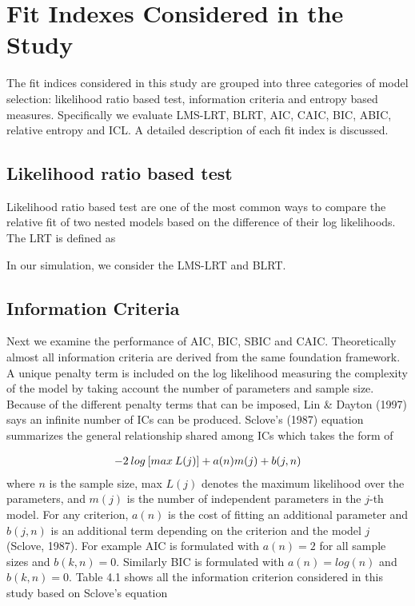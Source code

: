 

\section{Fit Indexes Considered in the Study}
The fit indices considered in this study are grouped into three categories of model selection: likelihood ratio based test, information criteria and entropy based measures. Specifically we evaluate LMS-LRT, BLRT, AIC, CAIC, BIC, ABIC, relative entropy and ICL. A detailed description of each fit index is discussed. 

\subsection{Likelihood ratio based test}
Likelihood ratio based test are one of the most common ways to compare the relative fit of two nested models based on the difference of their log likelihoods. The LRT is defined as 







In our simulation, we consider the LMS-LRT and BLRT. 





\subsection{Information Criteria}
\hspace{1em} Next we examine the performance of AIC, BIC, SBIC and CAIC. Theoretically almost all information criteria are derived from the same foundation framework. A unique penalty term is included on the log likelihood measuring the complexity of the model by taking account the number of parameters and sample size. Because of the different penalty terms that can be imposed, Lin & Dayton (1997) says an infinite number of ICs can be produced. Sclove's (1987) equation summarizes the general relationship shared among ICs which takes the form of 

\begin{align}
    -2 \hspace{0.2em} log \hspace{0.2em} [max \hspace{0.2em} L(j)] + a(n)m(j) + b(j,n)
\end{align}
where $n$ is the sample size, max $L(j)$ denotes the maximum likelihood over the parameters, and $m(j)$ is the number of independent parameters in the $j$-th model. For any criterion, $a(n)$ is the cost of fitting an additional parameter and $b(j,n)$ is an additional term depending on the criterion and the model $j$ (Sclove, 1987). For example AIC is formulated with $a(n)=2$ for all sample sizes and $b(k,n)=0$. Similarly BIC is formulated with $a(n)=log(n)$ and $b(k,n)=0$. Table 4.1 shows all the information criterion considered in this study based on Sclove's equation

